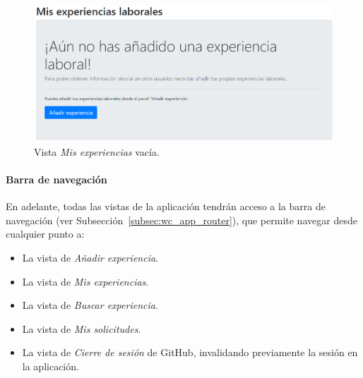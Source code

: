 \documentclass[a4paper, 12pt]{book}
\begin{document}
    \begin{figure}
        \centering
        \includegraphics[width=15cm, keepaspectratio]{img/my_we_empty.PNG}
        \caption{Vista \emph{Mis experiencias} vacía.}\label{fig:view_my_work_experiences_empty}
    \end{figure}

    \paragraph{Barra de navegación}
    En adelante, todas las vistas de la aplicación tendrán acceso a la barra de navegación (ver Subsección~\ref{subsec:wc_app_router}), que permite navegar desde cualquier punto a:
    \begin{itemize}
        \item La vista de \emph{Añadir experiencia}.
        \item La vista de \emph{Mis experiencias}.
        \item La vista de \emph{Buscar experiencia}.
        \item La vista de \emph{Mis solicitudes}.
        \item La vista de \emph{Cierre de sesión} de GitHub, invalidando previamente la sesión en la aplicación.
    \end{itemize}
\end{document}

